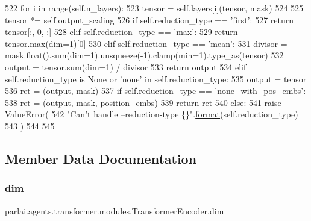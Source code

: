 \begin{DoxyCode}
522         \textcolor{keywordflow}{for} i \textcolor{keywordflow}{in} range(self.n\_layers):
523             tensor = self.layers[i](tensor, mask)
524 
525         tensor *= self.output\_scaling
526         \textcolor{keywordflow}{if} self.reduction\_type == \textcolor{stringliteral}{'first'}:
527             \textcolor{keywordflow}{return} tensor[:, 0, :]
528         \textcolor{keywordflow}{elif} self.reduction\_type == \textcolor{stringliteral}{'max'}:
529             \textcolor{keywordflow}{return} tensor.max(dim=1)[0]
530         \textcolor{keywordflow}{elif} self.reduction\_type == \textcolor{stringliteral}{'mean'}:
531             divisor = mask.float().sum(dim=1).unsqueeze(-1).clamp(min=1).type\_as(tensor)
532             output = tensor.sum(dim=1) / divisor
533             \textcolor{keywordflow}{return} output
534         \textcolor{keywordflow}{elif} self.reduction\_type \textcolor{keywordflow}{is} \textcolor{keywordtype}{None} \textcolor{keywordflow}{or} \textcolor{stringliteral}{'none'} \textcolor{keywordflow}{in} self.reduction\_type:
535             output = tensor
536             ret = (output, mask)
537             \textcolor{keywordflow}{if} self.reduction\_type == \textcolor{stringliteral}{'none\_with\_pos\_embs'}:
538                 ret = (output, mask, position\_embs)
539             \textcolor{keywordflow}{return} ret
540         \textcolor{keywordflow}{else}:
541             \textcolor{keywordflow}{raise} ValueError(
542                 \textcolor{stringliteral}{"Can't handle --reduction-type \{\}"}.\hyperlink{namespaceparlai_1_1chat__service_1_1services_1_1messenger_1_1shared__utils_a32e2e2022b824fbaf80c747160b52a76}{format}(self.reduction\_type)
543             )
544 
545 
\end{DoxyCode}


\subsection{Member Data Documentation}
\mbox{\label{classparlai_1_1agents_1_1transformer_1_1modules_1_1TransformerEncoder_ab56fa99f887753677dc7f4d435595114}} 
\subsubsection{\texorpdfstring{dim}{dim}}
{\footnotesize\ttfamily parlai.\+agents.\+transformer.\+modules.\+Transformer\+Encoder.\+dim}



